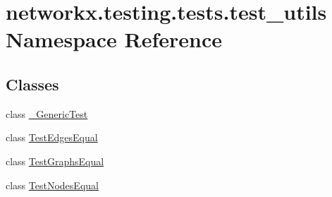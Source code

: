 \hypertarget{namespacenetworkx_1_1testing_1_1tests_1_1test__utils}{}\section{networkx.\+testing.\+tests.\+test\+\_\+utils Namespace Reference}
\label{namespacenetworkx_1_1testing_1_1tests_1_1test__utils}
\subsection*{Classes}
\begin{DoxyCompactItemize}
\item 
class \hyperlink{classnetworkx_1_1testing_1_1tests_1_1test__utils_1_1__GenericTest}{\+\_\+\+Generic\+Test}
\item 
class \hyperlink{classnetworkx_1_1testing_1_1tests_1_1test__utils_1_1TestEdgesEqual}{Test\+Edges\+Equal}
\item 
class \hyperlink{classnetworkx_1_1testing_1_1tests_1_1test__utils_1_1TestGraphsEqual}{Test\+Graphs\+Equal}
\item 
class \hyperlink{classnetworkx_1_1testing_1_1tests_1_1test__utils_1_1TestNodesEqual}{Test\+Nodes\+Equal}
\end{DoxyCompactItemize}
